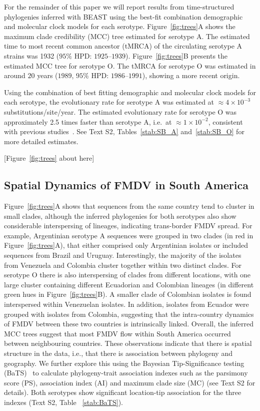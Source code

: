 \documentclass[10pt]{article}
\begin{document}
For the remainder of this paper we will report results from  time-structured phylogenies inferred with BEAST using the best-fit combination demographic and molecular clock models for each serotype.
Figure~\ref{fig:trees}A shows the maximum clade credibility (MCC) tree estimated for serotype A.
The estimated time to most recent common ancestor (tMRCA) of the circulating serotype A strains was 1932 ($95\%$ HPD: $1925$--$1939$).
Figure~\ref{fig:trees}B presents the estimated MCC tree for serotype O.
The tMRCA for serotype O was estimated in around $20$ years ($1989$, $95\%$ HPD: $ 1986$--$1991$), showing a more recent origin. 

Using the combination of best fitting demographic and molecular clock models for each serotype, the evolutionary rate for serotype A was estimated at $\approx 4 \times 10^{-3}$ substitutions/site/year.
The estimated evolutionary rate for serotype O was approximately 2.5 times faster than serotype A, i.e.~at $\approx 1 \times 10^{-2}$, consistent with previous studies~\cite{tully, Carvalho2013, Muellner2011}.
See Text S2, Tables~\ref{stab:SB_A} and~\ref{stab:SB_O} for more detailed estimates.

\begin{center}
 [Figure~\ref{fig:trees} about here]
\end{center}


\subsection*{Spatial Dynamics of FMDV in South America}

Figure~\ref{fig:trees}A shows that sequences from the same country tend to cluster in small clades, although the inferred phylogenies for both serotypes also show considerable interspersing of lineages, indicating trans-border FMDV spread.
For example, Argentinian serotype A sequences were grouped in two clades (in red in Figure~\ref{fig:trees}A), that either comprised only Argentinian isolates or included sequences from Brazil and Uruguay.
Interestingly, the majority of the isolates from Venezuela and Colombia cluster together within two distinct clades.
For serotype O there is also interspersing of clades from different locations, with one large cluster containing different Ecuadorian and Colombian lineages (in different green hues in Figure~\ref{fig:trees}B). 
A smaller clade of Colombian isolates is found interspersed within Venezuelan isolates.
In addition, isolates from Ecuador were grouped with isolates from Colombia, suggesting that the intra-country dynamics of FMDV between these two countries is intrinsically linked.
Overall, the inferred MCC trees suggest that most FMDV flow within South America occurred between neighbouring countries. 
These observations indicate that there is spatial structure in the data, i.e., that there is association between phylogeny and geography.
We further explore this using the Bayesian Tip-Significance testing (BaTS)~\cite{bats} to calculate phylogeny-trait association indexes such as the parsimony score (PS), association index (AI) and maximum clade size (MC) (see Text S2 for details).
Both serotypes show significant location-tip association for the three indexes (Text S2, Table ~\ref{stab:BaTS}).
\end{document}
